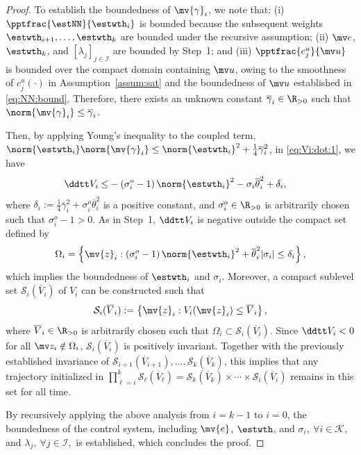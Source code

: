 \documentclass[letterpaper, journal]{IEEEtran}
\begin{document}
\begin{proof}
To establish the boundedness of $\mv{\gamma}_i$, we note that: 
(i) $\pptfrac{\estNN}{\estwth_i}$ is bounded because the subsequent weights $\estwth_{i+1},\ldots,\estwth_k$ are bounded under the recursive assumption; 
(ii) $\mv e$, $\estwth_k$, and $[\lambda_j]_{j\in\mathcal I}$ are bounded by Step~1; and 
(iii) $\pptfrac{c_j^u}{\mv u}$ is bounded over the compact domain containing $\mv u$, owing to the smoothness of $c_j^u(\cdot)$ in Assumption~\ref{assum:sat} and the boundedness of $\mv u$ established in \eqref{eq:NN:bound}. 
Therefore, there exists an unknown constant $\overline{\gamma}_i\in\R_{>0}$ such that $\norm{\mv{\gamma}_i}\leq\overline{\gamma}_i$.

Then, by applying Young's inequality to the coupled term, \ie $\norm{\estwth_i}\norm{\mv{\gamma}_i}\le\norm{\estwth_i}^2+\tfrac{1}{4}\overline{\gamma}_i^2$,  in \eqref{eq:Vi:dot:1}, we have
\begin{align} \label{eq:Vi:dot:2}
  \ddtt V_i
  \le&
    -
    \left(
      \sigma_i^o
      -
      1
    \right)
    \norm{\estwth_i}^2
    -
    \sigma_i \overline{\theta}_i^2
    +
    \delta_i
  ,
\end{align}
where $\delta_i:=\frac{1}{4}\overline{\gamma}_i^2 + \sigma_i^o \overline{\theta}_i^2$ is a positive constant, and $\sigma_i^o\in\R_{>0}$ is arbitrarily chosen such that $\sigma_i^o - 1 > 0$.
As in Step~1, $\ddtt V_i$ is negative outside the compact set defined by 
\begin{equation}
  \Omega_i
  =
  \left\{
    \mv{z}_i
    :
    \left(
      \sigma_i^o
      -
      1
    \right)
    \norm{\estwth_i}^2
    +
    \overline{\theta}_i^2
    \vert\sigma_i\vert
    \le
    \delta_i
  \right\}
  , 
\end{equation}
which implies the boundedness of $\estwth_i$ and $\sigma_i$.
Moreover, a compact sublevel set $\mathcal{S}_i(\overline{V}_i)$ of $V_i$ can be constructed such that 
\begin{equation} \label{eq:Si:def}
  \mathcal{S}_i(\overline{V}_i)
  :=
  \left\{
    \mv{z}_i
    :
    V_i(\mv{z}_i)
    \le
    \overline{V}_i
  \right\}
  ,
\end{equation}
where $\overline{V}_i\in\R_{>0}$ is arbitrarily chosen such that $\Omega_i \subset \mathcal{S}_i(\overline{V}_i)$.
Since $\ddtt V_i<0$ for all $\mv z_i\notin\Omega_i$, $\mathcal S_i(\overline V_i)$ is positively invariant. 
Together with the previously established invariance of $\mathcal S_{i+1}(\overline V_{i+1}),\ldots,\mathcal S_k(\overline V_k)$, this implies that any trajectory initialized in $\prod_{\ell=i}^k \mathcal{S}_\ell(\overline V_\ell) = \mathcal S_k(\overline V_k)\times\cdots\times\mathcal S_i(\overline V_i)$ remains in this set for all time.

By recursively applying the above analysis from $i=k-1$ to $i=0$, the boundedness of the control system, including $\mv{e}$, $\estwth$, and $\sigma_i,\ \forall i \in \mathcal{K},$ and $\lambda_j,\ \forall j \in \mathcal{I},$ is established, which concludes the proof.

\end{proof}
\end{document}
